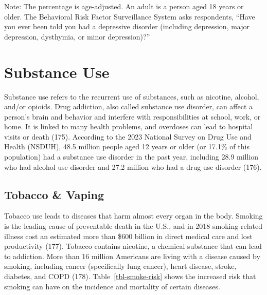 \documentclass[
  english,
  letterpaper,
]{report}
\begin{document}
\begin{tcolorbox}[enhanced jigsaw, breakable, leftrule=.75mm, title=\textcolor{quarto-callout-note-color}{\faInfo}\hspace{0.5em}{Note}, bottomrule=.15mm, opacityback=0, left=2mm, colback=white, bottomtitle=1mm, coltitle=black, colbacktitle=quarto-callout-note-color!10!white, colframe=quarto-callout-note-color-frame, opacitybacktitle=0.6, toptitle=1mm, titlerule=0mm, arc=.35mm, rightrule=.15mm, toprule=.15mm]

Note: The percentage is age-adjusted. An adult is a person aged 18 years
or older. The Behavioral Risk Factor Surveillance System asks
respondents, ``Have you ever been told you had a depressive disorder
(including depression, major depression, dysthymia, or minor
depression)?''

\end{tcolorbox}

\section{Substance Use}\label{substance-use}

Substance use refers to the recurrent use of substances, such as
nicotine, alcohol, and/or opioids. Drug addiction, also called substance
use disorder, can affect a person's brain and behavior and interfere
with responsibilities at school, work, or home. It is linked to many
health problems, and overdoses can lead to hospital visits or death
(175). According to the 2023 National Survey on Drug Use and Health
(NSDUH), 48.5 million people aged 12 years or older (or 17.1\% of this
population) had a substance use disorder in the past year, including
28.9 million who had alcohol use disorder and 27.2 million who had a
drug use disorder (176).

\subsection{Tobacco \& Vaping}\label{tobacco-vaping}

Tobacco use leads to diseases that harm almost every organ in the body.
Smoking is the leading cause of preventable death in the U.S., and in
2018 smoking-related illness cost an estimated more than \$600 billion
in direct medical care and lost productivity (177). Tobacco contains
nicotine, a chemical substance that can lead to addiction. More than 16
million Americans are living with a disease caused by smoking, including
cancer (specifically lung cancer), heart disease, stroke, diabetes, and
COPD (178). Table~\ref{tbl-smoke-risk} shows the increased risk that
smoking can have on the incidence and mortality of certain diseases.
\end{document}
